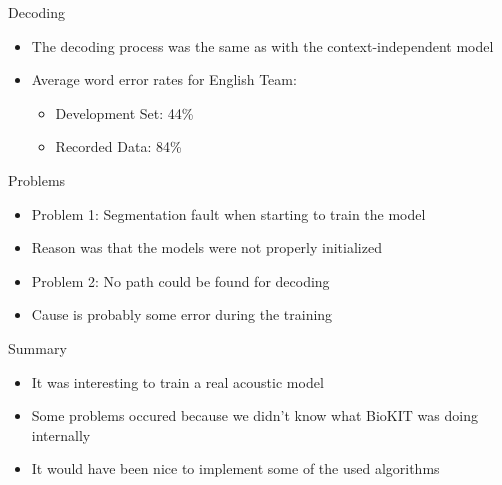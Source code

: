 \documentclass[18pt]{beamer}
\begin{document}
\begin{frame}{Decoding}
\begin{itemize}
\item The decoding process was the same as with the context-independent model
\pause \item Average word error rates for English Team:
\begin{itemize}
\item Development Set: 44\%
\item Recorded Data: 84\%
\end{itemize}
\end{itemize}
\end{frame}

\begin{frame}{Problems}
\begin{itemize}
\item Problem 1: Segmentation fault when starting to train the model
\pause \item Reason was that the models were not properly initialized
\pause \item Problem 2: No path could be found for decoding
\pause \item Cause is probably some error during the training
\end{itemize}
\end{frame}

\begin{frame}{Summary}
\begin{itemize}
\item It was interesting to train a real acoustic model
\pause \item Some problems occured because we didn't know what BioKIT was doing internally
\pause \item It would have been nice to implement some of the used algorithms
\end{itemize}
\end{frame}
\end{document}
